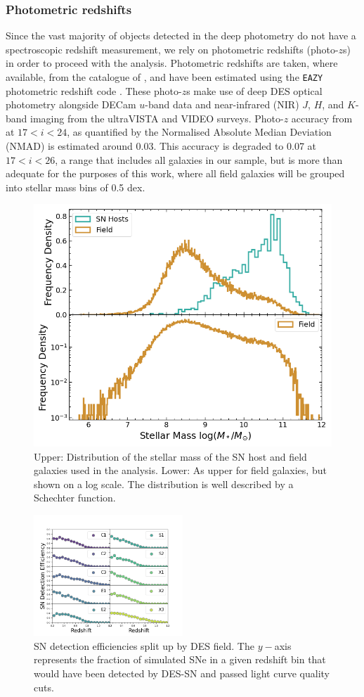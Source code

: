 \documentclass[fleqn,usenatbib]{mnras}
\begin{document}
\subsubsection{Photometric redshifts \label{subsubsec:photozs}}

Since the vast majority of objects detected in the deep photometry do not have a spectroscopic redshift measurement, we rely on photometric redshifts (photo-$z$s) in order to proceed with the analysis. 
Photometric redshifts are taken, where available, from the catalogue of \citet{Hartley2020}, and have been estimated using the \texttt{EAZY} photometric redshift code \citep{Brammer2008}. These photo-$z$s make use of deep DES optical photometry alongside DECam $u$-band data and near-infrared (NIR) $J$, $H$, and $K$-band imaging from the ultraVISTA and VIDEO surveys. Photo-$z$ accuracy from \citet{Hartley2020} at $17 < i<24$, as quantified by the Normalised Absolute Median Deviation (NMAD) is estimated around 0.03. This accuracy is degraded to 0.07 at $17 < i<26$, a range that includes all galaxies in our sample, but is more than adequate for the purposes of this work, where all field galaxies will be grouped into stellar mass bins of 0.5 dex.

\begin{figure}
    \centering
    \includegraphics[width=.5\textwidth]{figs/mass_hist_linlog_sn_field_BC03.png}
    \caption{Upper: Distribution of the stellar mass of the SN host and field galaxies used in the analysis. Lower: As upper for field galaxies, but shown on a log scale.  The distribution is well described by a Schechter function.}
    \label{fig:mass_hist_hosts_field}
\end{figure}


\begin{figure}
    \centering
    \includegraphics[width=0.5\textwidth]{figs/SN_efficiencies.png}
    \caption{SN detection efficiencies split up by DES field. The $y-$axis represents the fraction of simulated SNe in a given redshift bin that would have been detected by DES-SN and passed light curve quality cuts.
    \label{fig:SN_efficiency}}
\end{figure}
\end{document}
